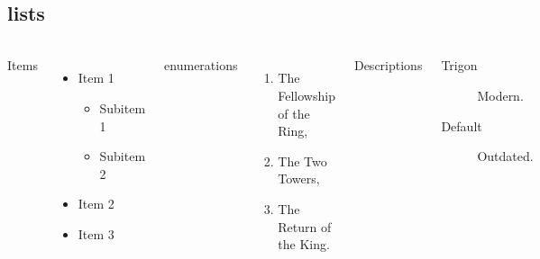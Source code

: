 \subsection{lists}
\begin{frame}{\insertsectionhead}
  \framesubtitle{\insertsubsectionhead}
  \begin{columns}[T,onlytextwidth]
    Items
    \begin{itemize}
      \item Item 1
        \begin{itemize}
          \item Subitem 1
          \item Subitem 2
        \end{itemize}
      \item Item 2
      \item Item 3
    \end{itemize}

    enumerations
    \begin{enumerate}
      \item The Fellowship of the Ring,
      \item The Two Towers,
      \item The Return of the King.
    \end{enumerate}

    Descriptions
    \begin{description}
      \item[Trigon] Modern. \item[Default] Outdated.
    \end{description}
  \end{columns}
\end{frame}

